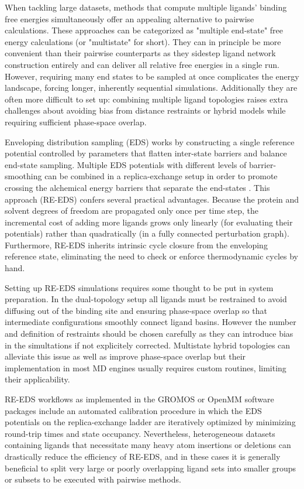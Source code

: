 \documentclass[9pt,bestpractices,pubversion]{livecoms}
\begin{document}
{\color{blue}
When tackling large datasets, methods that compute multiple ligands' binding free energies simultaneously offer an appealing alternative to pairwise calculations. These approaches can be categorized as "multiple end-state" free energy calculations (or "multistate" for short). They can in principle be more convenient than their pairwise counterparts as they sidestep ligand network construction entirely and can deliver all relative free energies in a single run. However, requiring many end states to be sampled at once complicates the energy landscape, forcing longer, inherently sequential simulations. Additionally they are often more difficult to set up: combining multiple ligand topologies raises extra challenges about avoiding bias from distance restraints or hybrid models while requiring sufficient phase-space overlap.

Enveloping distribution sampling \cite{christ2007enveloping} (EDS) works by constructing a single reference potential controlled by parameters that flatten inter-state barriers and balance end-state sampling. Multiple EDS potentials with different levels of barrier-smoothing can be combined in a replica-exchange setup in order to promote crossing the alchemical energy barriers that separate the end-states \cite{sidler2017efficient, champion2023accelerating}. This approach (RE-EDS) confers several practical advantages. Because the protein and solvent degrees of freedom are propagated only once per time step, the incremental cost of adding more ligands grows only linearly (for evaluating their potentials) rather than quadratically (in a fully connected perturbation graph). Furthermore, RE-EDS inherits intrinsic cycle closure from the enveloping reference state, eliminating the need to check or enforce thermodynamic cycles by hand.

Setting up RE-EDS simulations requires some thought to be put in system preparation. In the dual-topology setup all ligands must be restrained to avoid diffusing out of the binding site and ensuring phase-space overlap so that intermediate configurations smoothly connect ligand basins. However the number and definition of restraints should be chosen carefully as they can introduce bias in the simultations if not explicitely corrected. Multistate hybrid topologies can alleviate this issue as well as improve phase-space overlap \cite{champion2023accelerating} but their implementation in most MD engines usually requires custom routines, limiting their applicability.

RE-EDS workflows as implemented in the GROMOS \cite{champion2023accelerating} or OpenMM \cite{rieder2022leveraging} software packages include an automated calibration procedure in which the EDS potentials on the replica-exchange ladder are iteratively optimized by minimizing round-trip times and state occupancy. Nevertheless, heterogeneous datasets containing ligands that necessitate many heavy atom insertions or deletions can drastically reduce the efficiency of RE-EDS, and in these cases it is generally beneficial to split very large or poorly overlapping ligand sets into smaller groups or subsets to be executed with pairwise methods.
}
\end{document}
